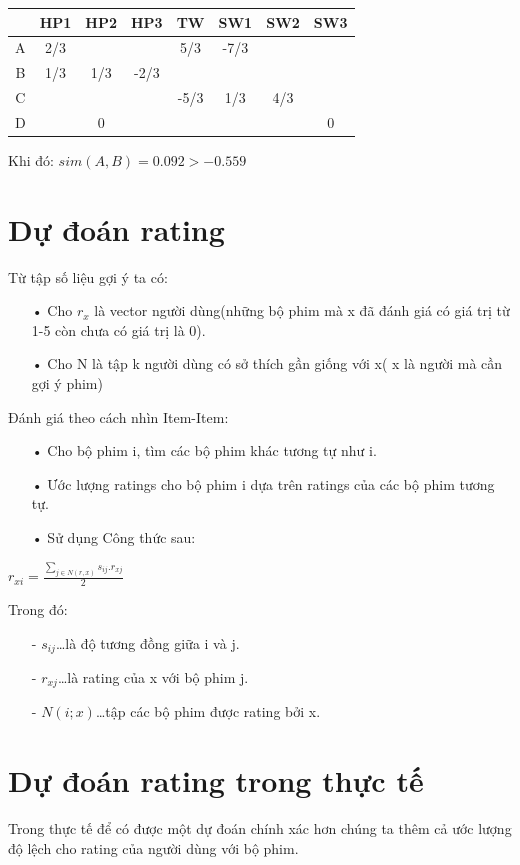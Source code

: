 \documentclass[a4paper,11pt]{report}
\begin{document}
\begin{center}
\begin{longtable}{c|ccccccc}
 & HP1 & HP2 & HP3 & TW & SW1 & SW2 & SW3 \\
 \hline
A & 2/3 & & & 5/3 & -7/3 & \\
B & 1/3 & 1/3 & -2/3 &   &  \\
C &  &   &  & -5/3 & 1/3 & 4/3\\
D &  & 0 &  &  &  &  & 0 \\
\end{longtable}
\end{center}
Khi đó: $sim(A,B) = 0.092 > -0.559$
\section{Dự đoán rating}
Từ tập số liệu gợi ý ta có:
\begin{itemize}
\item[•] Cho $r_x$ là vector người dùng(những bộ phim mà x đã đánh giá có giá trị từ 1-5 còn chưa có giá trị là 0).
\item[•] Cho N là tập k người dùng có sở thích gần giống với x( x là người mà cần gợi ý phim)
\end{itemize}
Đánh giá theo cách nhìn Item-Item:
\begin{itemize}
\item[•] Cho bộ phim i, tìm các bộ phim khác tương tự như i.
\item[•] Ước lượng ratings cho bộ phim i dựa trên ratings của các bộ phim tương tự.
\item[•] Sử dụng Công thức sau:
\end{itemize}

\begin{center}
\textbf{\huge{
$r_{xi} = \frac{\sum_{j\in N(r,x)}s_{ij}.r_{xj}}{2}$
}}
\end{center}
Trong đó:
\begin{itemize}
\item[-] $s_{ij}$\ldots là độ tương đồng giữa i và j.
\item[-] $r_{xj}$\ldots là rating của x với bộ phim j.
\item[-] $N(i;x)$\ldots tập các bộ phim được rating bởi x.
\end{itemize}
\section{Dự đoán rating trong thực tế}
Trong thực tế để có được một dự đoán chính xác hơn chúng ta thêm cả ước lượng độ lệch cho rating của người dùng với bộ phim.
\end{document}
